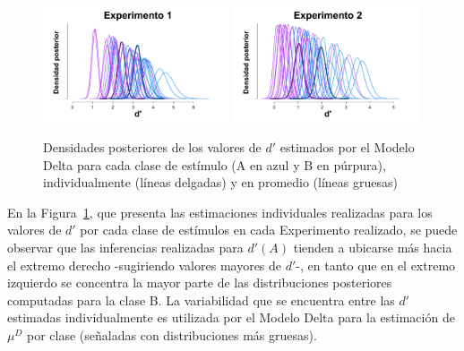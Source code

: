 \begin{figure}[h]
\centering
\includegraphics[width=0.49\textwidth]{Figures/MDelta_Dprima_E1} \includegraphics[width=0.49\textwidth]{Figures/MDelta_Dprima_E2}\\
\decoRule
\caption[Modelo Delta: Densidades posteriores de los valores de $d'$ estimados individualmente, y en promedio, por cada experimento]{Densidades posteriores de los valores de $d'$ estimados por el Modelo Delta para cada clase de estímulo (A en azul y B en púrpura), individualmente (líneas delgadas) y en promedio (líneas gruesas)}
\label{fig:Delta_Dprima}
\end{figure}

En la Figura~\ref{fig:Delta_Dprima}, que presenta las estimaciones individuales realizadas para los valores de $d'$ por cada clase de estímulos en cada Experimento realizado, se puede observar que las inferencias realizadas para $d'(A)$ tienden a ubicarse más hacia el extremo derecho -sugiriendo valores mayores de $d'$-, en tanto que en el extremo izquierdo se concentra la mayor parte de las distribuciones posteriores computadas para la clase B. La variabilidad que se encuentra entre las $d'$ estimadas individualmente es utilizada por el Modelo Delta para la estimación de $\mu^D$ por clase (señaladas con distribuciones más gruesas).\\

